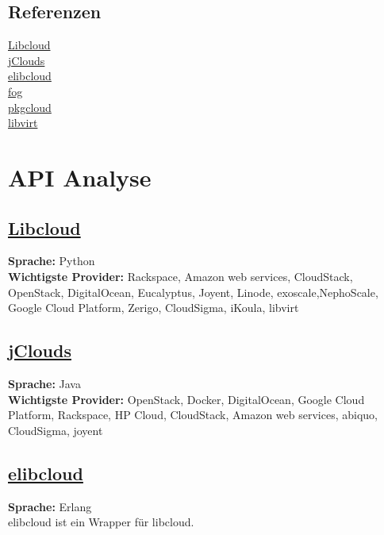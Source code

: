 \subsection{Referenzen}
\href{https://libcloud.apache.org}{Libcloud}\\
\href{https://jclouds.apache.org}{jClouds}\\
\href{https://github.com/esl/elibcloud}{elibcloud}\\
\href{https://github.com/fog/fog/blob/master/lib/fog/openstack/docs/getting_started.md}{fog}\\
\href{https://github.com/pkgcloud/pkgcloud}{pkgcloud}\\
\href{http://http://libvirt.org/}{libvirt}\\

\newpage

\section{API Analyse}
\subsection{\href{https://libcloud.apache.org}{Libcloud}}
\textbf{Sprache: }Python\\
\textbf{Wichtigste Provider: }Rackspace, Amazon web services, CloudStack, OpenStack, DigitalOcean, Eucalyptus, Joyent, Linode, exoscale,NephoScale, Google Cloud Platform, Zerigo, CloudSigma, iKoula, libvirt\\

\subsection{\href{https://jclouds.apache.org}{jClouds}}
\textbf{Sprache: }Java\\
\textbf{Wichtigste Provider: }OpenStack, Docker, DigitalOcean, Google Cloud Platform, 
Rackspace, HP Cloud, CloudStack, Amazon web services, abiquo, CloudSigma, joyent\\

\subsection{\href{https://github.com/esl/elibcloud}{elibcloud}}
\textbf{Sprache: }Erlang\\
elibcloud ist ein Wrapper für libcloud.\\

